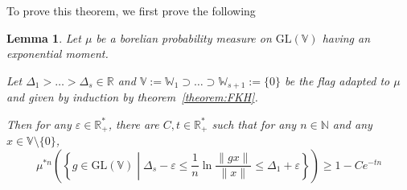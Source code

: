 \documentclass[11pt]{amsart}
\newtheorem{lemma}[theorem]{Lemma}
\theoremstyle{definition}
\theoremstyle{remark}
\numberwithin{equation}{section}
\begin{document}
To prove this theorem, we first prove the following
\begin{lemma} \label{lemma:LDPmatrices}
Let $\mu$ be a borelian probability measure on $\mathrm{GL}({\mathbb V})$ having an exponential moment.

Let $\Delta_1>\dots>\Delta_s\in {\mathbb R}$ and ${\mathbb V}:={\mathbb W}_1 \supset \dots \supset {\mathbb W}_{s+1}:=\{0\}$ be the flag adapted to $\mu$ and given by induction by theorem~\ref{theorem:FKH}.

Then for any $\varepsilon \in {\mathbb R}_+^\ast$, there are $C,t\in {\mathbb R}_+^\ast$ such that for any $n\in {\mathbb N}$ and any $x\in {\mathbb V}\setminus\{0\}$,
\[
\mu^{\ast n} \left( \left\{ g \in \mathrm{GL}({\mathbb V})\middle| \Delta_s - \varepsilon \leqslant\frac 1 n \ln \frac{ \|gx\|}{\|x\|}  \leqslant \Delta_1 + \varepsilon\right\}\right) \geqslant 1 - Ce^{-tn}
\]
\end{lemma}
\end{document}
